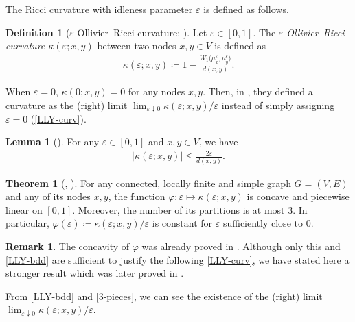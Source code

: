 \documentclass{article}
\numberwithin{equation}{section}
\theoremstyle{definition}
\newtheorem{definition}{Definition}[section]
\newtheorem{remark}[remark]{Remark}
\newtheorem{thm}[thm]{Theorem}
\newtheorem{lemma}[lemma]{Lemma}
\newcommand{\K}{\kappa}
\newcommand{\eps}{\varepsilon} %
\newcommand{\dto}{\downarrow}
\newcommand{\wxy}{W_1\big(\mu_x^\eps,\mu_y^\eps\big)}
\newcommand{\kexy}{\kappa(\eps;x,y)}
\def\:={\coloneqq} %
\begin{document}
The Ricci curvature with idleness parameter $\eps$ is defined as follows.

\begin{definition}[$\eps$-Ollivier--Ricci curvature; \cite{Ol,LLY}] \label{eps-curv}
Let $\eps\in[0,1]$.
The \emph{$\eps$-Ollivier--Ricci curvature $\kexy$} between two nodes $x,y\in V$ is defined as 
\begin{align*}
\kexy\:=1-\frac{\wxy}{d(x,y)}.
\end{align*}
\end{definition}

When $\eps=0$, $\K(0;x,y)=0$ for any nodes $x,y$.
Then, in \cite{LLY}, they defined a curvature as the (right) limit $\lim_{\eps\dto0}\kexy/\eps$ instead of simply assigning $\eps=0$ (\autoref{LLY-curv}).


\begin{lemma}[{\cite[Lemma 2.2]{LLY}}] \label{LLY-bdd}
For any $\eps\in[0,1]$ and $x,y\in V$, we have
\begin{align*}
|\kexy|\leq\frac{2\eps}{d(x,y)}. %
\end{align*}
\end{lemma}

\begin{thm}[{\cite[Theorem 3.4]{BCLMP}, \cite[Theorem 3.2]{CK}}] \label{3-pieces}
For any connected, locally finite and simple graph $G=(V,E)$ and any of its nodes $x,y$, the function $\varphi:\eps\mapsto\kexy$ is concave and piecewise linear on $[0,1]$.
Moreover, the number of its partitions is at most $3$.
In particular, $\varphi(\eps)\:=\kexy/\eps$ is constant for $\eps$ sufficiently close to $0$.
\end{thm}

\begin{remark}  \label{LLY-concavity}
The concavity of $\varphi$ was already proved in \cite[Lemma 2.1]{LLY}.
Although only this \cite[Lemma 2.1]{LLY} and \autoref{LLY-bdd} are sufficient to justify the following \autoref{LLY-curv}, we have stated here a stronger result which was later proved in \cite{BCLMP,CK}.
\end{remark}

From \autoref{LLY-bdd} and \autoref{3-pieces}, we can see the existence of the (right) limit $\lim_{\eps\dto0}\kexy/\eps$.
\end{document}
